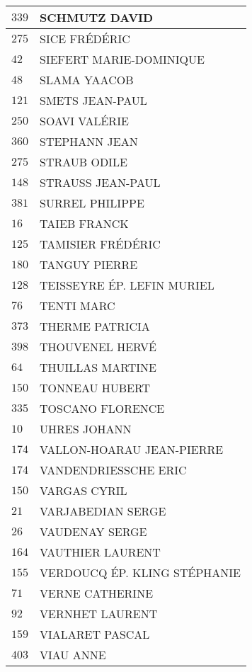\begin{xltabular}{\linewidth}{|l|X|}
    \hline
    $339$ & SCHMUTZ DAVID \\
    \hline
    $275$ & SICE FRÉDÉRIC \\
    \hline
    $42$ & SIEFERT MARIE-DOMINIQUE \\
    \hline
    $48$ & SLAMA YAACOB \\
    \hline
    $121$ & SMETS JEAN-PAUL \\
    \hline
    $250$ & SOAVI VALÉRIE \\
    \hline
    $360$ & STEPHANN JEAN \\
    \hline
    $275$ & STRAUB ODILE \\
    \hline
    $148$ & STRAUSS JEAN-PAUL \\
    \hline
    $381$ & SURREL PHILIPPE \\
    \hline
    $16$ & TAIEB FRANCK \\
    \hline
    $125$ & TAMISIER FRÉDÉRIC \\
    \hline
    $180$ & TANGUY PIERRE \\
    \hline
    $128$ & TEISSEYRE ÉP. LEFIN MURIEL \\
    \hline
    $76$ & TENTI MARC \\
    \hline
    $373$ & THERME PATRICIA \\
    \hline
    $398$ & THOUVENEL HERVÉ \\
    \hline
    $64$ & THUILLAS MARTINE \\
    \hline
    $150$ & TONNEAU HUBERT \\
    \hline
    $335$ & TOSCANO FLORENCE \\
    \hline
    $10$ & UHRES JOHANN \\
    \hline
    $174$ & VALLON-HOARAU JEAN-PIERRE \\
    \hline
    $174$ & VANDENDRIESSCHE ERIC \\
    \hline
    $150$ & VARGAS CYRIL \\
    \hline
    $21$ & VARJABEDIAN SERGE \\
    \hline
    $26$ & VAUDENAY SERGE \\
    \hline
    $164$ & VAUTHIER LAURENT \\
    \hline
    $155$ & VERDOUCQ ÉP. KLING STÉPHANIE \\
    \hline
    $71$ & VERNE CATHERINE \\
    \hline
    $92$ & VERNHET LAURENT \\
    \hline
    $159$ & VIALARET PASCAL \\
    \hline
    $403$ & VIAU ANNE \\

\end{xltabular}
